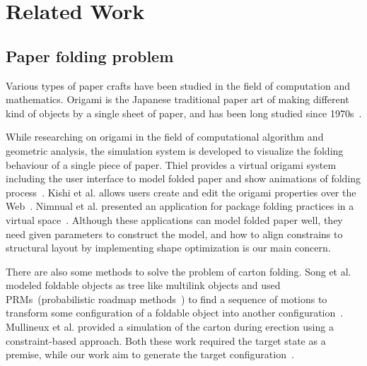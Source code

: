 \section{Related Work}\label{sec:relatedwork}
\subsection{Paper folding problem}
Various types of paper crafts have been studied in the field of computation and mathematics. Origami is the Japanese traditional paper art of making different kind of objects by a single sheet of paper, and has been long studied since 1970s~\cite{KANADE1980279}.

While researching on origami in the field of computational algorithm and geometric analysis, the simulation system is developed to visualize the folding behaviour of a single piece of paper. Thiel provides a virtual origami system including the user interface to model folded paper and show animations of folding process~\cite{Thiel1998}. Kishi et al. allows users create and edit the origami properties over the Web~\cite{Kishi:1998:OFP:786112.786279}. Nimnual et al. presented an application for package folding practices in a virtual space~\cite{Nimnual2007Virtual}. Although these applications can model folded paper well, they need given parameters to construct the model, and how to align constrains to structural layout by implementing shape optimization is our main concern.

There are also some methods to solve the problem of carton folding. 
Song et al. modeled foldable objects as tree like multilink objects and used PRMs~(probabilistic roadmap methods~\cite{Kavraki:1994:PRP:891758}) to find a sequence of motions to transform some configuration of a foldable object into another configuration~\cite{Song:2000:MPA:892954}. 
Mullineux et al. provided a simulation of the carton during erection using a constraint-based approach. Both these work required the target state as a premise, while our work aim to generate the target configuration~\cite{Mullineux:2010:CSC:1739328.1739673}.

